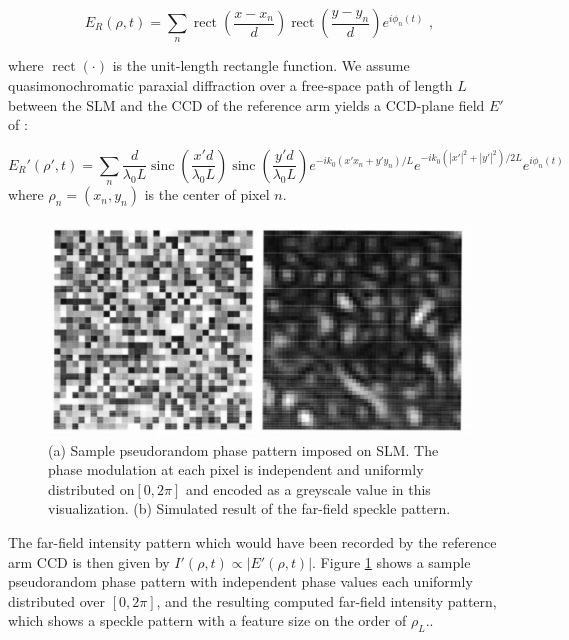 \begin{equation}
E_R(\rho, t) = \sum_n \operatorname{rect}\left(\frac{x-x_n}{d}\right) \operatorname{rect}\left(\frac{y-y_n}{d}\right) e^{i\phi_n(t)}\,\,,
\end{equation}

where $\operatorname{rect}(\cdot)$ is the unit-length rectangle function. We assume quasimonochromatic paraxial diffraction over a free-space path of length $L$ between the SLM and the CCD of the reference arm yields a CCD-plane field $E'$ of \cite{hardy-thesis}:

\begin{equation}
E_R'(\rho', t) = \sum_n \frac{d}{\lambda_0 L} \operatorname{sinc}\left(\frac{x'd}{\lambda_0 L}\right) \operatorname{sinc}\left(\frac{y'd}{\lambda_0 L}\right) e^{-i k_0(x'x_n + y'y_n)/L} e^{-ik_0(|x'|^2 + |y'|^2)/2L} e^{i\phi_n(t)}
\end{equation}
where $\rho_n = (x_n, y_n)$ is the center of pixel $n$.

\begin{figure}[t]
\begin{center}
\includegraphics[width=13cm]{figure-ghost-slm-speckle.pdf}
\caption{(a) Sample pseudorandom phase pattern imposed on SLM. The phase modulation at each pixel is independent and uniformly distributed on$\left[0, 2\pi \right]$ and encoded as a greyscale value in this visualization. (b) Simulated result of the far-field speckle pattern.}
\label{figure:ghost-slm-speckle}
\end{center}
\end{figure}


The far-field intensity pattern which would have been recorded by the reference arm CCD is then given by $I'(\rho, t) \propto |E'(\rho, t)|$. Figure \ref{figure:ghost-slm-speckle} shows a sample pseudorandom phase pattern with independent phase values each uniformly distributed over $[0, 2\pi]$, and the resulting computed far-field intensity pattern, which shows a speckle pattern with a feature size on the order of $\rho_L$..

